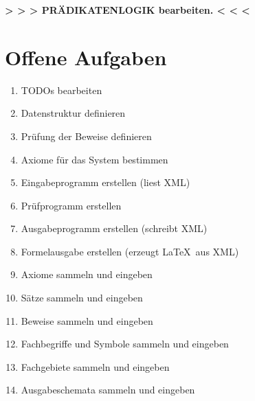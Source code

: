 \documentclass[english,ngerman,parskip=half,headsepline,footsepline]{scrreprt}
\begin{document}
	\par \textbf{> > > PRÄDIKATENLOGIK bearbeiten. < < <} %

	\section{Offene Aufgaben} %
	\label{Offene Aufgaben}

	\begin{enumerate}
		\item TODOs bearbeiten
		\item Datenstruktur definieren
		\item Prüfung der Beweise definieren
		\item Axiome für das System bestimmen
		\item Eingabeprogramm erstellen (liest XML)
		\item Prüfprogramm erstellen
		\item Ausgabeprogramm erstellen (schreibt XML)
		\item Formelausgabe erstellen (erzeugt \LaTeX\ aus XML)
		\item Axiome sammeln und eingeben
		\item Sätze sammeln und eingeben
		\item Beweise sammeln und eingeben
		\item Fachbegriffe und Symbole sammeln und eingeben
		\item Fachgebiete sammeln und eingeben
		\item Ausgabeschemata sammeln und eingeben
	\end{enumerate}

    \clearpage


	\ihead{\textnormal{\textsf{\textbf{\listtablename}}}}
	\begin{minipage}{\textwidth-10.95pt}
    	\listoftables
    \end{minipage}\par
	\thispagestyle{scrheadings}


	\ihead{\textnormal{\textsf{\textbf{\listfigurename}}}}
    \begin{minipage}{\textwidth-10.95pt}
    	\listoffigures
    \end{minipage}\par
	\thispagestyle{scrheadings}
\end{document}
